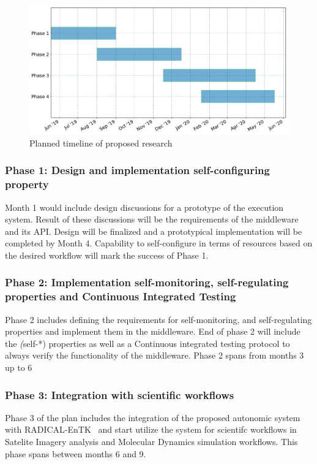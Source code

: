 \label{timeline}
\begin{figure}[t]
	\centering
	\includegraphics[width=.95\textwidth]{figures/phd_plan.pdf}
	\caption{Planned timeline of proposed research}\label{fig:work_plan}
\end{figure}

\subsubsection{Phase 1: Design and implementation self-configuring property}

Month 1 would include design discussions for a prototype of the execution system. 
Result of these discussions will be the requirements of the middleware and its 
API. Design will be finalized and a prototypical implementation will be completed 
by Month 4. Capability to self-configure in terms of resources based on the desired 
workflow will mark the success of Phase 1.

\subsubsection{Phase 2: Implementation self-monitoring, self-regulating properties
and Continuous Integrated Testing}
Phase 2 includes defining the requirements for self-monitoring, and self-regulating 
properties and implement them in the middleware. End of phase 2 will include the 
\textit(self-*) properties as well as a Continuous integrated testing protocol to 
always verify the functionality of the middleware. Phase 2 spans from months 3 up 
to 6

\subsubsection{Phase 3: Integration with scientific workflows}
Phase 3 of the plan includes the integration of the proposed autonomic system with 
RADICAL-EnTK~\cite{balasubramanian2018harnessing} and start utilize the system for 
scientifc workflows in Satelite Imagery analysis and Molecular Dynamics simulation 
workflows. This phase spans between months 6 and 9.

